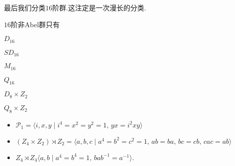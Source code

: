 最后我们分类$16$阶群.这注定是一次漫长的分类.
\begin{prop}
	$16$阶非Abel群只有\par
	\begin{itemize*}
		\item $D_{16}$\phantom{\qquad}
		\item $SD_{16}$\phantom{\qquad}
		\item $M_{16}$\phantom{\qquad}
		\item $Q_{16}$\phantom{\qquad}
		\item $D_{8}\times Z_2$\phantom{\qquad}
		\item $Q_8\times Z_2$\phantom{\qquad}
	\end{itemize*}
	\begin{itemize}
		\item $\mathcal{P}_1=\langle i,x,y\mid i^4=x^2=y^2=1,\,yx=i^2xy\rangle$
		\item $(Z_4\times Z_2)\rtimes Z_2=\langle a,b,c\mid a^4=b^2=c^2=1,\,ab=ba,\,bc=cb,\,cac=ab\rangle $
		\item $Z_4\rtimes Z_4\langle a,b\mid a^4=b^4=1,\,bab^{-1}=a^{-1}\rangle $.
	\end{itemize}
\end{prop}
